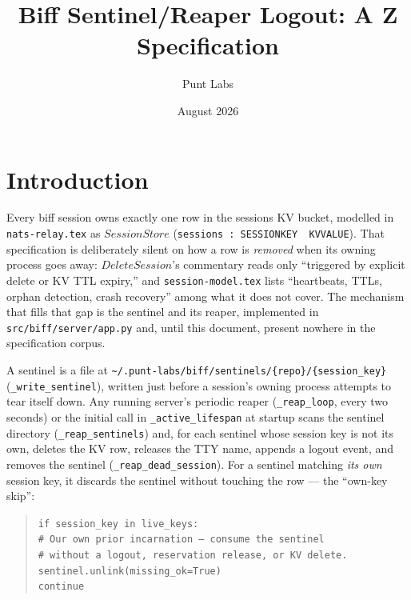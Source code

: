 \documentclass[a4paper,10pt,fleqn]{article}
\begin{document}
\title{Biff Sentinel/Reaper Logout: A Z Specification}
\author{Punt Labs}
\date{August 2026}
\maketitle

\tableofcontents
\newpage

\section{Introduction}
\label{sec:intro}

Every biff session owns exactly one row in the sessions KV bucket,
modelled in \texttt{nats-relay.tex} as $SessionStore$
(\texttt{sessions~:~SESSIONKEY~\pfun~KVVALUE}).  That specification is
deliberately silent on how a row is \emph{removed} when its owning
process goes away: $DeleteSession$'s commentary reads only ``triggered
by explicit delete or KV TTL expiry,'' and \texttt{session-model.tex}
lists ``heartbeats, TTLs, orphan detection, crash recovery'' among what
it does not cover.  The mechanism that fills that gap is the sentinel
and its reaper, implemented in \texttt{src/biff/server/app.py} and,
until this document, present nowhere in the specification corpus.

A sentinel is a file at
\texttt{\textasciitilde/.punt-labs/biff/sentinels/\{repo\}/\{session\_key\}}
(\texttt{\_write\_sentinel}), written just before a session's owning
process attempts to tear itself down.  Any running server's periodic
reaper (\texttt{\_reap\_loop}, every two seconds) or the initial call in
\texttt{\_active\_lifespan} at startup scans the sentinel directory
(\texttt{\_reap\_sentinels}) and, for each sentinel whose session key is
not its own, deletes the KV row, releases the TTY name, appends a
logout event, and removes the sentinel (\texttt{\_reap\_dead\_session}).
For a sentinel matching \emph{its own} session key, it discards the
sentinel without touching the row --- the ``own-key skip'':

\begin{quote}
\texttt{if session\_key in live\_keys:\\
\hphantom{xx}\# Our own prior incarnation --- consume the sentinel\\
\hphantom{xx}\# without a logout, reservation release, or KV delete.\\
\hphantom{xx}sentinel.unlink(missing\_ok=True)\\
\hphantom{xx}continue}
\end{quote}
\end{document}
